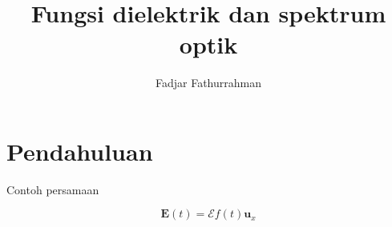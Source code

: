 \documentclass[a4paper,bahasa]{paper}
\begin{document}
\title{Fungsi dielektrik dan spektrum optik}
\author{Fadjar Fathurrahman}
\date{}
\maketitle

\section{Pendahuluan}

Contoh persamaan

\begin{equation}
\mathbf{E}(t) = \mathcal{E} f(t) \mathbf{u}_{x}
\end{equation}
\end{document}
